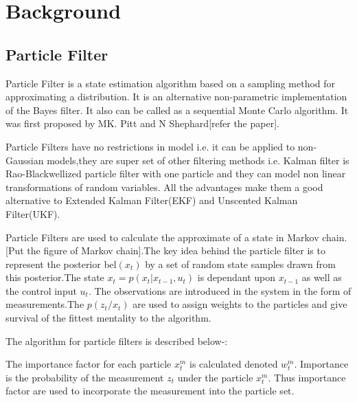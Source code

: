 \documentclass[12pt]{dalcsthesis}
\begin{document}
\chapter{Background}

\section{Particle Filter}

Particle Filter is a state estimation algorithm based on a sampling method for approximating a distribution. It is an alternative non-parametric implementation of the Bayes filter. It also can be called as a sequential Monte Carlo algorithm. It was first proposed by MK. Pitt and N Shephard[refer the paper]. 

Particle Filters have no restrictions in model i.e. it can be applied to non-Gaussian models,they are super set of other filtering methods i.e. Kalman filter is Rao-Blackwellized particle filter with one particle and they can model non linear transformations of random variables. All the advantages make them a good alternative to Extended Kalman Filter(EKF) and Unscented Kalman Filter(UKF). 


Particle Filters are used to calculate the approximate of a state in Markov chain.[Put the figure of Markov chain].The key idea behind the particle filter is to represent the posterior bel$(x_{t})$ by a set of random state samples drawn from this posterior.The state $ x _{t}=p(x_{t}|x_{t-1},u _{t})$ is dependant upon $ x _{t-1}$ as well as the control input $u _{t}$. The observations are introduced in the system in the form of measurements.The $p(z_{t}/x_{t})$ are used to assign weights to the particles and give survival of the fittest mentality to the algorithm.  

The algorithm for particle filters is described below-:

\begin{algorithm}[H]
 \SetAlgoLined
  		 
\Begin{
\For{ m=1 to M do 
sample $x_{t}^{m}~p(x_{t}|u_{t},x_{t-1}^m)$
$w_{t}^{m}=p(z_{t}|x_{t}^{m})$
$X_{t}^{-}=X_{t}^{-}+(x_{t}^{m},w_{t}^m)$}
\For{m=1 to M do
draw $i$ with probability $\propto$ $w_{t}^{[i]}$
add $x_{t}^{[i]}$ to $X_{t}$}
return $X_{t}$
\end{algorithm}

The importance factor for each particle $x_{t}^{m}$ is calculated denoted $w_{t}^{m}$. Importance is the probability of the measurement $z_{t}$ under the particle $x_{t}^{m}$. Thus importance factor are used to incorporate the measurement into the particle set.
\end{document}
